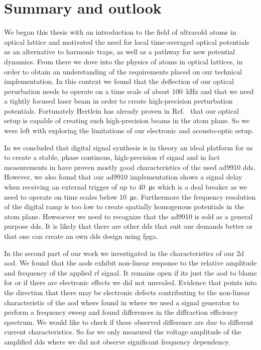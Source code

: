 \chapter{Summary and outlook}

We began this thesis with an introduction to the field of ultracold atoms
in optical lattice and motivated the need for local time-averaged optical
potentials as an alternative to harmonic traps, as well as a pathway for new
potential dynamics. From there we dove into the physics of atoms in optical
lattices, in order to obtain an understanding of the requirements placed on
our technical implementation. In this context we found that the deflection of
our optical perurbation needs to operate on a time scale of about
\SI{100}{\kilo\hertz} and that we need a tightly focused laser beam in order
to create high-precision perturbation potentials. Fortunately
Hertlein has already proven in Ref.~\cite{Hertlein2017} that our optical setup
is capable of creating such high-precision beams in the atom plane. So we were
left with exploring the limitations of our electronic and acousto-optic setup.

In  we concluded that digital signal
synthesis is in theory an ideal platform for us to create a stable, phase
continous, high-precision \gls{rf} signal and in fact measurements in
 have proven mostly good characteristics of the
used \gls{ad9910} \gls{dds}. However, we also found that our \gls{ad9910}
implementation shows a signal delay when receiving an external trigger of up
to \SI{40}{\micro\second} which is a deal breaker as we need to operate on
time scales below \SI{10}{\micro\second}. Furthermore the frequency resolution
of the digital ramp is too low to create spatially homogenous potentials in
the atom plane. Howsoever we need to recognize that the \gls{ad9910} is sold
as a general purpose \gls{dds}. It is likely that there are other \gls{dds}
that suit our demands better or that one can create an own \gls{dds} design
using \gls{fpga}.

In the second part of our work we investigated in the characteristics of our
\gls{2d} \gls{aod}. We found that the \gls{aod}s exhibit non-linear response
to the relative amplitude and frequency of the applied \gls{rf} signal. It
remains open if its just the \gls{aod} to blame for or if there are electronic
effects we did not unvealed. Evidence that points into the direction that
there may be electronic defects contributing to the non-linear characteristic
of the \gls{aod} where found in  where
we used a signal generator to perform a frequency sweep and found differences
in the diffraction efficiency spectrum. We would like to check if these
observed difference are due to different current characteristics. So far we
only measured the voltage amplitude of the amplified \gls{dds} where we did
not observe significant frequency dependency.

